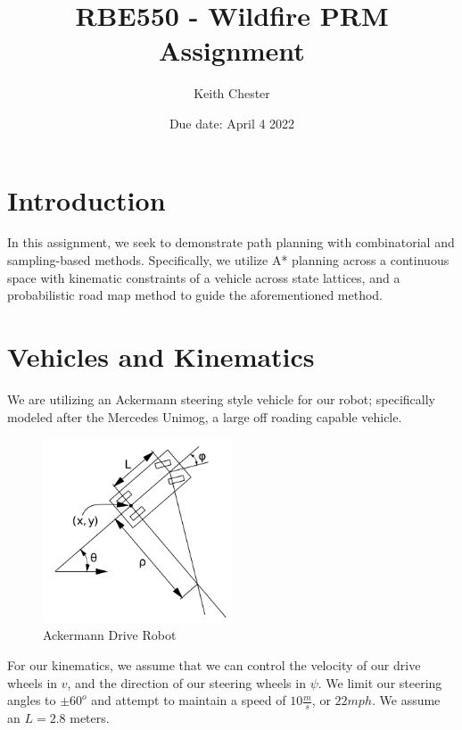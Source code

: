 \documentclass{article}
\title{RBE550 - Wildfire PRM Assignment}
\author{Keith Chester}
\date{Due date: April 4 2022}
\begin{document}
\maketitle

\section*{Introduction}

In this assignment, we seek to demonstrate path planning with combinatorial and sampling-based methods. Specifically, we utilize A* planning across a continuous space with kinematic constraints of a vehicle across state lattices, and a probabilistic road map method to guide the aforementioned method.

\section*{Vehicles and Kinematics}
We are utilizing an Ackermann steering style vehicle for our robot; specifically modeled after the Mercedes Unimog, a large off roading capable vehicle.

\begin{figure}[H]
    \centering
    \includegraphics[width = 0.5\textwidth]{imgs/ackermann.png}
    \caption{Ackermann Drive Robot}
    \label{fig:ackermann-drive}
\end{figure}

For our kinematics, we assume that we can control the velocity of our drive wheels in $v$, and the direction of our steering wheels in $\psi$. We limit our steering angles to $\pm 60^o$ and attempt to maintain a speed of $10 \frac{m}{s}$, or $22 mph$. We assume an $L=2.8$ meters.
\end{document}
